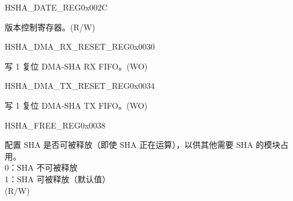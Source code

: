 \begin{register}{H}{SHA\_DATE\_REG}{0x002C}\label{regdesc:SHADATEREG}
%
%
\regnewline%
\begin{regdesc}\begin{reglist}
\label{fielddesc:SHADATE}\item [SHA\_DATE] 版本控制寄存器。(R/W)
\end{reglist}\end{regdesc}
\end{register}


\begin{register}{H}{SHA\_DMA\_RX\_RESET\_REG}{0x0030}\label{regdesc:SHADMARXRESETREG}
%
%
\regnewline%
\begin{regdesc}\begin{reglist}
\label{fielddesc:SHADMARXRESET}\item [SHA\_DMA\_RX\_RESET] 写 1 复位 DMA-SHA RX FIFO。(WO)
\end{reglist}\end{regdesc}
\end{register}


\begin{register}{H}{SHA\_DMA\_TX\_RESET\_REG}{0x0034}\label{regdesc:SHADMATXRESETREG}
%
%
\regnewline%
\begin{regdesc}\begin{reglist}
\label{fielddesc:SHADMATXRESET}\item [SHA\_DMA\_TX\_RESET] 写 1 复位 DMA-SHA TX FIFO。(WO)
\end{reglist}\end{regdesc}
\end{register}


\begin{register}{H}{SHA\_FREE\_REG}{0x0038}\label{regdesc:SHAFREEREG}
%
%
\regnewline%
\begin{regdesc}\begin{reglist}
\label{fielddesc:SHAFREE}\item [SHA\_FREE] 配置 SHA 是否可被释放（即使 SHA 正在运算），以供其他需要 SHA 的模块占用。\\
0：SHA 不可被释放\\
1：SHA 可被释放（默认值） \\(R/W)
\end{reglist}\end{regdesc}
\end{register}


